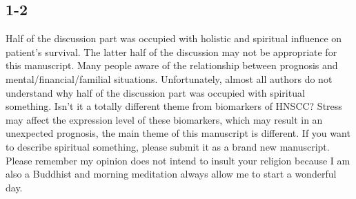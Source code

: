 \documentclass[preprint,12pt]{elsarticle}
\begin{document}



\subsection*{1-2}
\label{page:1-2}
Half of the discussion part was occupied with holistic and spiritual influence on patient’s survival.
The latter half of the discussion may not be appropriate for this manuscript. Many people aware of the relationship between prognosis and mental/financial/familial situations. Unfortunately, almost all authors do not understand why half of the discussion part was occupied with spiritual something. Isn’t it a totally different theme from biomarkers of HNSCC?
Stress may affect the expression level of these biomarkers, which may result in an unexpected prognosis, the main theme of this manuscript is different. If you want to describe spiritual something, please submit it as a brand new manuscript.
Please remember my opinion does not intend to insult your religion because I am also a Buddhist and morning meditation always allow me to start a wonderful day.
\end{document}
